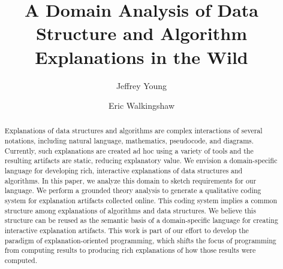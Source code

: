 \documentclass[sigconf]{acmart}
\begin{document}
\title{A Domain Analysis of Data Structure and Algorithm Explanations in the Wild}


\author{Jeffrey Young} 
\author{Eric Walkingshaw} 

\begin{abstract}
%
Explanations of data structures and algorithms are complex interactions of
several notations, including natural language, mathematics, pseudocode, and
diagrams. Currently, such explanations are created ad hoc using a variety of
tools and the resulting artifacts are static, reducing explanatory value. We
envision a domain-specific language for developing rich, interactive
explanations of data structures and algorithms. In this paper, we analyze this
domain to sketch requirements for our language. We perform a grounded theory
analysis to generate a qualitative coding system for explanation artifacts
collected online. This coding system implies a common structure among
explanations of algorithms and data structures. We believe this structure can
be reused as the semantic basis of a domain-specific language for creating
interactive explanation artifacts. This work is part of our effort to develop
the paradigm of explanation-oriented programming, which shifts the focus of
programming from computing results to producing rich explanations of how those
results were computed.
%
\end{abstract}

%
%



\end{document}
